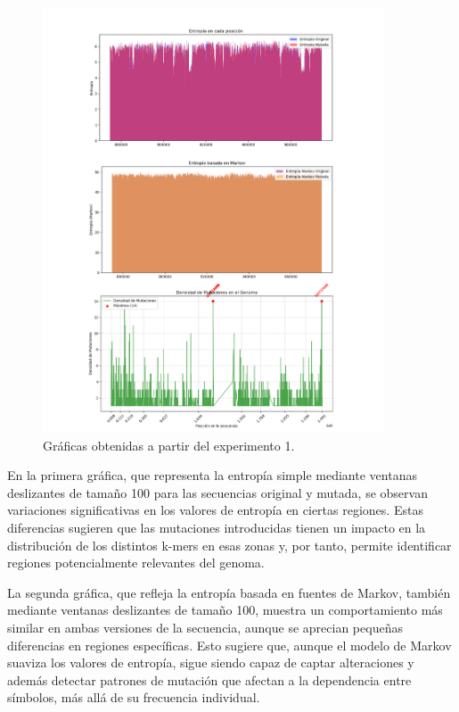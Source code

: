 \documentclass[11pt,spanish,listoffigures,listoftables]{tfgetsinf}
\begin{document}
\begin{figure}[H]
      \centering
      \includegraphics[width=0.9\textwidth]{graf_exp1.png}
      \caption{Gráficas obtenidas a partir del experimento 1.}
      \label{fig:etiqueta_opcional12}
\end{figure}

En la primera gráfica, que representa la entropía simple mediante ventanas deslizantes de tamaño 100 para las secuencias original y mutada, se observan variaciones significativas en los valores de entropía en ciertas regiones. Estas diferencias sugieren que las mutaciones introducidas tienen un impacto en la distribución de los distintos k-mers en esas zonas y, por tanto, permite identificar regiones potencialmente relevantes del genoma. 

La segunda gráfica, que refleja la entropía basada en fuentes de Markov, también mediante ventanas deslizantes de tamaño 100, muestra un comportamiento más similar en ambas versiones de la secuencia, aunque se aprecian pequeñas diferencias en regiones específicas. Esto sugiere que, aunque el modelo de Markov suaviza los valores de entropía, sigue siendo capaz de captar alteraciones y además detectar patrones de mutación que afectan a la dependencia entre símbolos, más allá de su frecuencia individual.  
\end{document}
